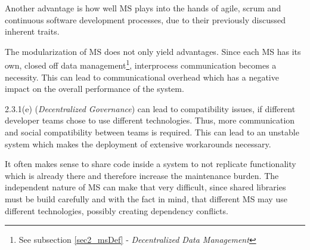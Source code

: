 Another advantage is how well MS plays into the hands of agile, scrum and continuous software development processes, due to their previously discussed inherent traits.

The modularization of MS does not only yield advantages. Since each MS has its own, closed off data management\footnote{See subsection \ref{sec2_msDef} - \emph{Decentralized Data Management}}, interprocess communication becomes a necessity. This can lead to communicational overhead which has a negative impact on the overall performance of the system\cite{Wolff16}.

2.3.1(e) (\emph{Decentralized Governance}) can lead to compatibility issues, if different developer teams chose to use different technologies. Thus, more communication and social compatibility between teams is required. This can lead to an unstable system which makes the deployment of extensive workarounds necessary\cite{Riggins15}.

It often makes sense to share code inside a system to not replicate functionality which is already there and therefore increase the maintenance burden. The independent nature of MS can make that very difficult, since shared libraries must be build carefully and with the fact in mind, that different MS may use different technologies, possibly creating dependency conflicts.


